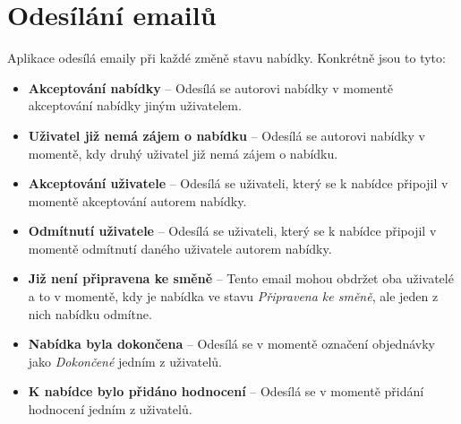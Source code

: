 \section{Odesílání emailů}

\label{nur:mail}

Aplikace odesílá emaily při každé změně stavu nabídky. Konkrétně jsou to tyto:
\begin{itemize}
    \item \textbf{Akceptování nabídky} -- Odesílá se autorovi nabídky v momentě akceptování nabídky jiným uživatelem.
    \item \textbf{Uživatel již nemá zájem o nabídku} -- Odesílá se autorovi nabídky v momentě, kdy druhý uživatel již nemá zájem o nabídku.
    \item \textbf{Akceptování uživatele} -- Odesílá se uživateli, který se k nabídce připojil v momentě akceptování autorem nabídky.
    \item \textbf{Odmítnutí uživatele} -- Odesílá se uživateli, který se k nabídce připojil v momentě odmítnutí daného uživatele autorem nabídky.
    \item \textbf{Již není připravena ke směně} -- Tento email mohou obdržet oba uživatelé a to v momentě, kdy je nabídka ve stavu \textit{Připravena ke směně}, ale jeden z nich nabídku odmítne.
    \item \textbf{Nabídka byla dokončena} -- Odesílá se v momentě označení objednávky jako \textit{Dokončené} jedním z uživatelů.
    \item \textbf{K nabídce bylo přidáno hodnocení} -- Odesílá se v momentě přidání hodnocení jedním z uživatelů.
\end{itemize}